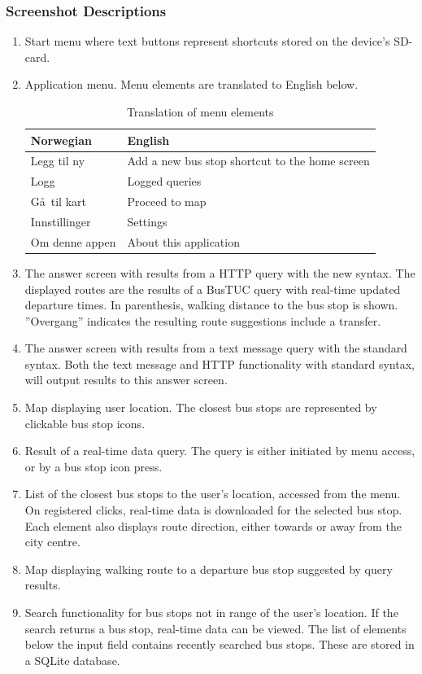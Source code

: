 \subsubsection{Screenshot Descriptions}
\begin{enumerate}
\item{Start menu where text buttons represent shortcuts stored on the device's SD-card.}
\item{Application menu. Menu elements are translated to English below. \\
\begin{table}
\caption{Translation of menu elements}
    \begin{tabular}{ |  l  |  l  |}
    \hline
    \textbf{Norwegian} & \textbf{English} \\ \hline
 Legg til ny & Add a new bus stop shortcut to the home screen\\ \hline
   Logg & Logged queries\\ \hline
    G\aa\ til kart & Proceed to map\\ \hline
   Innstillinger & Settings\\ \hline
   Om denne appen & About this application\\ \hline
    \end{tabular}
\end{table}
}
\item{The answer screen with results from a HTTP query with the new syntax. The displayed routes are the results of a BusTUC query with real-time updated departure times. In parenthesis, walking distance to the bus stop is shown. ''Overgang'' indicates the resulting route suggestions include a transfer.}
\item{The answer screen with results from a text message query with the standard syntax. Both the text message and HTTP functionality with standard syntax, will output results to this answer screen.}
\item{Map displaying user location. The closest bus stops are represented by clickable bus stop icons.}
\item{Result of a real-time data query. The query is either initiated by menu access, or by a bus stop icon press.}
\item{List of the closest bus stops to the user's location, accessed from the menu. On registered clicks, real-time data is downloaded for the selected bus stop. Each element also displays route direction, either towards or away from the city centre.}
\item{Map displaying walking route to a departure bus stop suggested by query results.}
\item{Search functionality for bus stops not in range of the user's location. If the search returns a bus stop, real-time data can be viewed. The list of elements below the input field contains recently searched bus stops. These are stored in a SQLite database.}
\end{enumerate}



